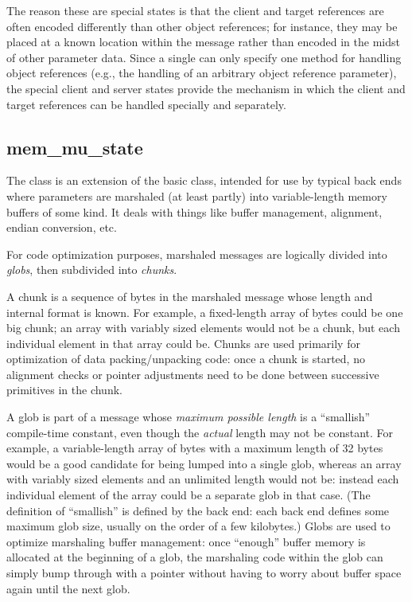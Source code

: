 The reason these are special states is that the client and target references
are often encoded differently than other object references; for instance, they
may be placed at a known location within the message rather than encoded in the
midst of other parameter data.  Since a single  can only
specify one method for handling object references (e.g., the handling of an
arbitrary object reference parameter), the special client and server states
provide the mechanism in which the client and target references can be handled
specially and separately.

\subsection{mem\_mu\_state}
\label{subsec:BE:memmustate}

The  class is an extension of the basic 
class, intended for use by typical back ends where parameters are marshaled (at
least partly) into variable-length memory buffers of some kind.  It deals with
things like buffer management, alignment, endian conversion, etc.

For code optimization purposes, marshaled messages are logically divided into
\emph{globs}, then subdivided into \emph{chunks}.

A chunk is a sequence of bytes in the marshaled message whose length and
internal format is known.  For example, a fixed-length array of bytes could be
one big chunk; an array with variably sized elements would not be a chunk, but
each individual element in that array could be.  Chunks are used primarily for
optimization of data packing/unpacking code: once a chunk is started, no
alignment checks or pointer adjustments need to be done between successive
primitives in the chunk.

A glob is part of a message whose \emph{maximum possible length} is a
``smallish'' compile-time constant, even though the \emph{actual} length may
not be constant.  For example, a variable-length array of bytes with a maximum
length of 32 bytes would be a good candidate for being lumped into a single
glob, whereas an array with variably sized elements and an unlimited length
would not be: instead each individual element of the array could be a separate
glob in that case.  (The definition of ``smallish'' is defined by the back end:
each back end defines some maximum glob size, usually on the order of a few
kilobytes.)  Globs are used to optimize marshaling buffer management: once
``enough'' buffer memory is allocated at the beginning of a glob, the
marshaling code within the glob can simply bump through with a pointer without
having to worry about buffer space again until the next glob.

